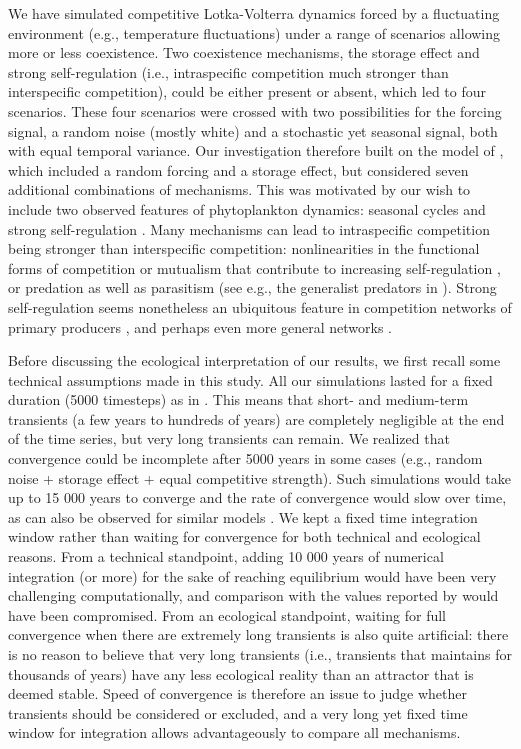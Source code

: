 \documentclass[smallcondensed,referee]{svjour3}       %
\begin{document}
We have simulated competitive Lotka-Volterra dynamics forced by a
fluctuating environment (e.g., temperature fluctuations) under a range
of scenarios allowing more or less coexistence. Two coexistence mechanisms,
the storage effect and strong self-regulation (i.e., intraspecific
competition much stronger than interspecific competition), could be
either present or absent, which led to four scenarios. These four
scenarios were crossed with two possibilities for the forcing signal,
a random noise (mostly white) and a stochastic yet seasonal signal,
both with equal temporal variance. Our investigation therefore built
on the model of \citet{scranton_coexistence_2016}, which included
a random forcing and a storage effect, but considered seven additional
combinations of mechanisms. This was motivated by our wish to include
two observed features of phytoplankton dynamics: seasonal cycles \citep{winder_annual_2010}
and strong self-regulation \citep{chesson_mechanisms_2000,adler_coexistence_2010,barraquand2018coastal}.
Many mechanisms can lead to intraspecific competition being stronger
than interspecific competition: nonlinearities in the functional forms
of competition or mutualism that contribute to increasing self-regulation
\citep{kawatsu2018density}, or predation as well as parasitism (see
e.g., the generalist predators in \citealp{haydon1994pivotal}). Strong
self-regulation seems nonetheless an ubiquitous feature in competition
networks of primary producers \citep{adler_competition_2018}, and
perhaps even more general networks \citep{barabas_self-regulation_2017}.

Before discussing the ecological interpretation of our results, we
first recall some technical assumptions made in this study. All our
simulations lasted for a fixed duration (5000 timesteps) as in \citet{scranton_coexistence_2016}.
This means that short- and medium-term transients (a few years to
hundreds of years) are completely negligible at the end of the time
series, but very long transients can remain. We realized that convergence
could be incomplete after 5000 years in some cases (e.g., random noise
+ storage effect + equal competitive strength). Such simulations would
take up to 15 000 years to converge and the rate of convergence would
slow over time, as can also be observed for similar models \citep{scheffer_self-organized_2006}.
We kept a fixed time integration window rather than waiting for convergence
for both technical and ecological reasons. From a technical standpoint,
adding 10 000 years of numerical integration (or more) for the sake
of reaching equilibrium would have been very challenging computationally,
and comparison with the values reported by \citet{scranton_coexistence_2016}
would have been compromised. From an ecological standpoint, waiting
for full convergence when there are extremely long transients \citep{hastings_transient_2018}
is also quite artificial: there is no reason to believe that very
long transients (i.e., transients that maintains for thousands of
years) have any less ecological reality than an attractor that is
deemed stable. Speed of convergence is therefore an issue to judge
whether transients should be considered or excluded, and a very long
yet fixed time window for integration allows advantageously to compare
all mechanisms. 
\end{document}
